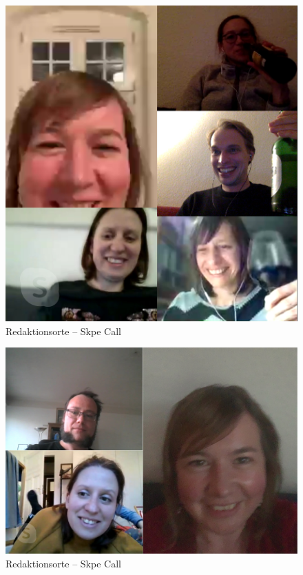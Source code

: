 \documentclass[a4paper,
fontsize=11pt,
oneside,
numbers=noperiodatend,
parskip=half-,
bibliography=totoc,
final
]{scrartcl}
\begin{document}
\begin{figure}
\centering
\includegraphics{img/redaktionscall1.jpeg}
\caption{Redaktionsorte -- Skpe Call}
\end{figure}

\begin{figure}
\centering
\includegraphics{img/redaktionscall2.jpg}
\caption{Redaktionsorte -- Skpe Call}
\end{figure}
\end{document}

